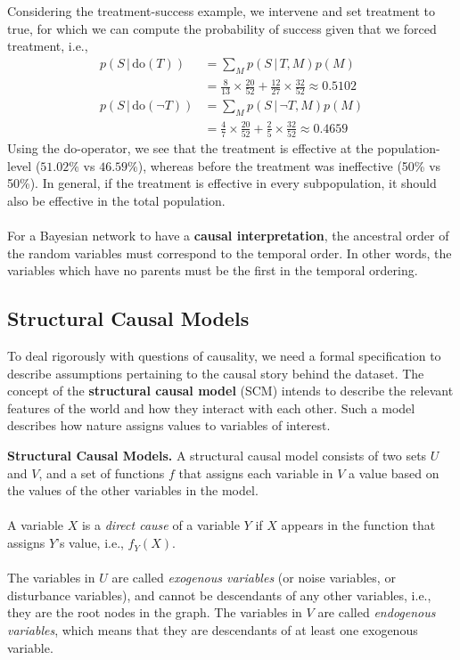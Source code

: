 \documentclass{article}
\newcommand{\giv}{\,|\,}
\begin{document}
Considering the treatment-success example, we intervene and set treatment to true, for which we can compute the probability of success given that we forced treatment, i.e., 
\begin{align*}
    p(S \giv \text{do}(T)) &= \sum_M p(S \giv T, M) p(M) \\
    &= \frac{8}{13} \times \frac{20}{52} + \frac{12}{27} \times \frac{32}{52} \approx 0.5102\\
    p(S \giv \text{do}(\neg T)) &= \sum_M p(S \giv \neg T, M) p(M) \\
    &= \frac{4}{7} \times \frac{20}{52} + \frac{2}{5} \times \frac{32}{52} \approx 0.4659
\end{align*}
\noindent Using the do-operator, we see that the treatment is effective at the population-level ($51.02\%$ vs $46.59\%$), whereas before the treatment was ineffective (50\% vs 50\%). In general, if the treatment is effective in every subpopulation, it should also be effective in the total population.
\\\\
\noindent For a Bayesian network to have a \textbf{causal interpretation}, the ancestral order of the random variables must correspond to the temporal order. In other words, the variables which have no parents must be the first in the temporal ordering. 

\subsection{Structural Causal Models}

To deal rigorously with questions of causality, we need a formal specification to describe assumptions pertaining to the causal story behind the dataset. The concept of the \textbf{structural causal model} (SCM) intends to describe the relevant features of the world and how they interact with each other. Such a model describes how nature assigns values to variables of interest. 
\\
\begin{theorem}
    \textbf{Structural Causal Models.} A structural causal model consists of two sets $U$ and $V$, and a set of functions $f$ that assigns each variable in $V$ a value based on the values of the other variables in the model. 
    \\\\
    A variable $X$ is a \textit{direct cause} of a variable $Y$ if $X$ appears in the function that assigns $Y$'s value, i.e., $f_Y(X)$. 
    \\\\
    \noindent The variables in $U$ are called \textit{exogenous variables} (or noise variables, or disturbance variables), and cannot be descendants of any other variables, i.e., they are the root nodes in the graph. The variables in $V$ are called \textit{endogenous variables}, which means that they are descendants of at least one exogenous variable.   
\end{theorem}
\end{document}

